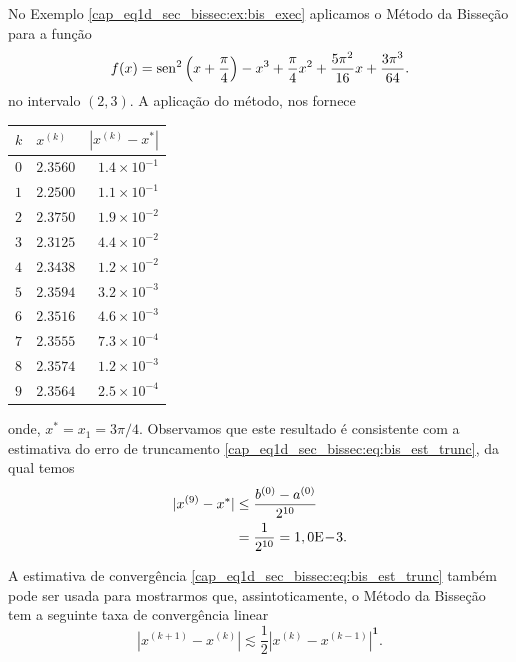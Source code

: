 \begin{ex}\label{cap_eq1d_sec_bissec:ex:bis_convp}
  No Exemplo \ref{cap_eq1d_sec_bissec:ex:bis_exec} aplicamos o Método da Bisseção para a função
\begin{equation}
  f(x) = \operatorname{sen}^2\left(x+\frac{\pi}{4}\right) - x^3 + \frac{\pi}{4}x^2 + \frac{5\pi^2}{16}x + \frac{3\pi^3}{64}.
\end{equation}
no intervalo $(2, 3)$. A aplicação do método, nos fornece
\begin{center}
  \begin{tabular}[H]{llr}
    $k$ & $x^{(k)}$ & $\left|x^{(k)}-x^{*}\right|$\\\hline
    $0$ & $2.3560$ & $1.4\times 10^{-1}$ \\
    $1$ & $2.2500$ & $1.1\times 10^{-1}$ \\
    $2$ & $2.3750$ & $1.9\times 10^{-2}$ \\
    $3$ & $2.3125$ & $4.4\times 10^{-2}$ \\
    $4$ & $2.3438$ & $1.2\times 10^{-2}$ \\
    $5$ & $2.3594$ & $3.2\times 10^{-3}$ \\
    $6$ & $2.3516$ & $4.6\times 10^{-3}$ \\
    $7$ & $2.3555$ & $7.3\times 10^{-4}$ \\
    $8$ & $2.3574$ & $1.2\times 10^{-3}$ \\
    $9$ & $2.3564$ & $2.5\times 10^{-4}$ \\\hline
  \end{tabular}
\end{center}
onde, $x^* = x_1 = 3\pi/4$. Observamos que este resultado é consistente com a estimativa do erro de truncamento \eqref{cap_eq1d_sec_bissec:eq:bis_est_trunc}, da qual temos
\begin{align}
  |x^{(9)} - x^*| &\leq \frac{b^{(0)}-a^{(0)}}{2^{10}}\\
                  &= \frac{1}{2^{10}} = 1,0\mathrm{E}\!-\!3.
\end{align}
\end{ex}

\begin{obs}
  A estimativa de convergência \eqref{cap_eq1d_sec_bissec:eq:bis_est_trunc} também pode ser usada para mostrarmos que, assintoticamente, o Método da Bisseção tem a seguinte taxa de convergência linear
  \begin{equation}
    \left|x^{(k+1)} - x^{(k)}\right| \lesssim \frac{1}{2}\left|x^{(k)} - x^{(k-1)}\right|^{\pmb{1}}.
  \end{equation}
\end{obs}

